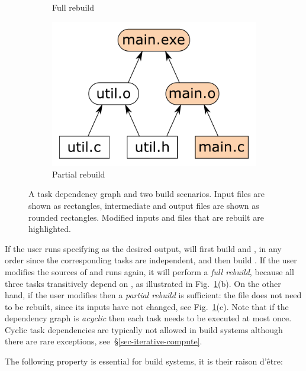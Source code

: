 \begin{figure}[h]
\begin{subfigure}[b]{0.32\linewidth}
\caption{Full rebuild}
\end{subfigure}
\begin{subfigure}[b]{0.32\linewidth}
\centerline{\includegraphics[scale=0.28]{fig/make-example-partial.pdf}}
\caption{Partial rebuild}
\end{subfigure}
\vspace{-2mm}
\caption{A task dependency graph and two build scenarios. Input files are shown
as rectangles, intermediate and output files are shown as rounded rectangles.
Modified inputs and files that are rebuilt are highlighted.
\label{fig-make}}
\vspace{-2mm}
\end{figure}

If the user runs \Make specifying  as the desired output, \Make
will first build  and , in any order since the
corresponding tasks are independent, and then build . If the
user modifies the sources of  and runs \Make again, it will
perform a \emph{full rebuild}, because all three tasks transitively depend on
, as illustrated in Fig.~\ref{fig-make}(b). On the other hand, if
the user modifies  then a \emph{partial rebuild} is sufficient:
the file  does not need to be rebuilt, since its inputs have not
changed, see Fig.~\ref{fig-make}(c). Note that if the dependency graph is
\emph{acyclic} then each task needs to be executed at most once. Cyclic task
dependencies are typically not allowed in build systems although there are rare
exceptions, see~\S\ref{sec-iterative-compute}.

The following property is essential for build systems, it is their raison d'\^etre:

